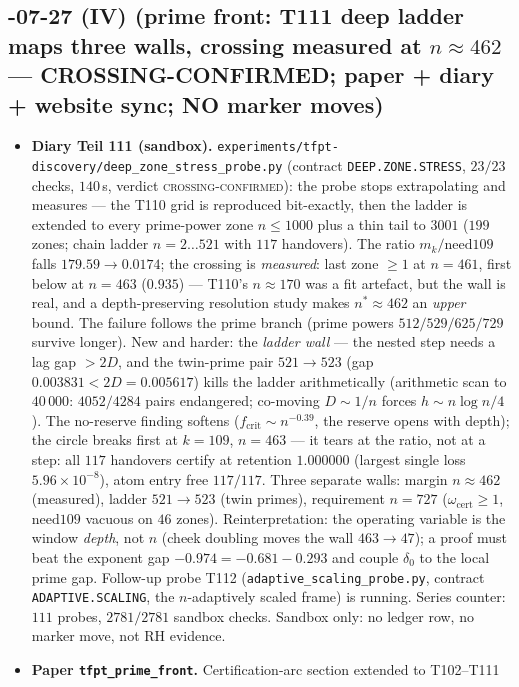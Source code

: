 \documentclass[11pt]{article}
\begin{document}
\subsection*{-07-27 (IV) (prime front: T111 deep ladder maps three walls, crossing measured at $n\approx462$ --- CROSSING-CONFIRMED; paper + diary + website sync; NO marker moves)}
\begin{itemize}[leftmargin=1.5em]
\item \textbf{Diary Teil 111 (sandbox).} \texttt{experiments/tfpt-discovery/deep\_zone\_stress\_probe.py}
(contract \texttt{DEEP.ZONE.STRESS}, $23/23$ checks, $140$\,s, verdict \textsc{crossing-confirmed}):
the probe stops extrapolating and measures --- the T110 grid is reproduced bit-exactly, then the
ladder is extended to every prime-power zone $n\le1000$ plus a thin tail to $3001$ ($199$ zones;
chain ladder $n=2\ldots521$ with $117$ handovers). The ratio $m_k/\mathrm{need109}$ falls
$179.59\to0.0174$; the crossing is \emph{measured}: last zone $\ge1$ at $n=461$, first below at
$n=463$ ($0.935$) --- T110's $n\approx170$ was a fit artefact, but the wall is real, and a
depth-preserving resolution study makes $n^*\approx462$ an \emph{upper} bound. The failure follows
the prime branch (prime powers $512/529/625/729$ survive longer). New and harder: the \emph{ladder
wall} --- the nested step needs a lag gap $>2D$, and the twin-prime pair $521\to523$ (gap
$0.003831<2D=0.005617$) kills the ladder arithmetically (arithmetic scan to $40\,000$: $4052/4284$
pairs endangered; co-moving $D\sim1/n$ forces $h\sim n\log n/4$). The no-reserve finding softens
($f_{\mathrm{crit}}\sim n^{-0.39}$, the reserve opens with depth); the circle breaks first at
$k=109$, $n=463$ --- it tears at the ratio, not at a step: all $117$ handovers certify at retention
$1.000000$ (largest single loss $5.96\times10^{-8}$), atom entry free $117/117$. Three separate
walls: margin $n\approx462$ (measured), ladder $521\to523$ (twin primes), requirement $n=727$
($\omega_{\mathrm{cert}}\ge1$, $\mathrm{need109}$ vacuous on $46$ zones). Reinterpretation: the
operating variable is the window \emph{depth}, not $n$ (cheek doubling moves the wall $463\to47$);
a proof must beat the exponent gap $-0.974=-0.681-0.293$ and couple $\delta_0$ to the local prime
gap. Follow-up probe T112 (\texttt{adaptive\_scaling\_probe.py}, contract \texttt{ADAPTIVE.SCALING},
the $n$-adaptively scaled frame) is running. Series counter: $111$ probes, $2781/2781$ sandbox
checks. Sandbox only: no ledger row, no marker move, not RH evidence.
\item \textbf{Paper \texttt{tfpt\_prime\_front}.} Certification-arc section extended to T102--T111

\end{itemize}
\end{document}
